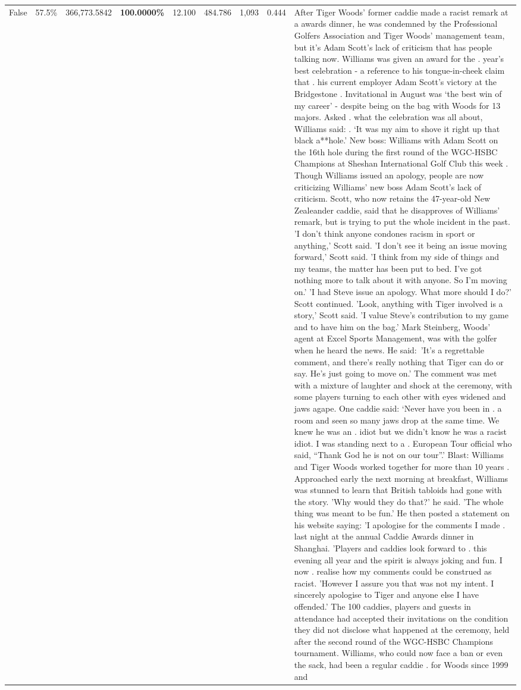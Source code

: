 \begin{table}[H]
\begin{tabular}{lllrlllll}
False & 57.5\% & 366,773.5842 & \bfseries \color{red} 100.0000\% & 12.100 & 484.786 & 1,093 & 0.444 & After Tiger Woods' former caddie made a racist remark at a awards dinner, he was condemned by the Professional Golfers Association and Tiger Woods' management team, but it's Adam Scott's lack of criticism that has people talking now. Williams was given an award for the . year’s best celebration - a reference to his tongue-in-cheek claim that . his current employer Adam Scott’s victory at the Bridgestone . Invitational in August was ‘the best win of my career’ - despite being on the bag with Woods for 13 majors. Asked . what the celebration was all about, Williams said: . ‘It was my aim to shove it right up that black a**hole.’ New boss: Williams with Adam Scott  on the 16th hole during the first round of the WGC-HSBC Champions at Sheshan International Golf Club this week . Though Williams issued an apology, people are now criticizing Williams' new boss Adam Scott's lack of criticism. Scott, who now retains the 47-year-old New Zealeander caddie, said that he disapproves of Williams' remark, but is trying to put the whole incident in the past. 'I don't think anyone condones racism in sport or anything,' Scott said. 'I don't see it being an issue moving forward,' Scott said. 'I think from my side of things and my teams, the matter has been put to bed. I've got nothing more to talk about it with anyone. So I'm moving on.' 'I had Steve issue an apology. What more should I do?' Scott continued. 'Look, anything with Tiger involved is a story,' Scott said. 'I value Steve's contribution to my game and to have him on the bag.' Mark Steinberg, Woods' agent at Excel Sports Management, was with the golfer when he heard the news. He said: 'It's a regrettable comment, and there's really nothing that Tiger can do or say. He's just going to move on.' The comment was met with a mixture of laughter and shock at the ceremony, with some players turning to each other with eyes widened and jaws agape. One caddie said: ‘Never have you been in . a room and seen so many jaws drop at the same time. We knew he was an . idiot but we didn’t know he was a racist idiot. I was standing next to a . European Tour official who said, “Thank God he is not on our tour”.’ Blast: Williams and Tiger Woods worked together for more than 10 years . Approached early the next morning at breakfast, Williams was stunned to learn that British tabloids had gone with the story. 'Why would they do that?' he said. 'The whole thing was meant to be fun.' He then posted a statement on his website saying: 'I apologise for the comments I made . last night at the annual Caddie Awards dinner in Shanghai. 'Players and caddies look forward to . this evening all year and the spirit is always joking and fun. I now . realise how my comments could be construed as racist. 'However I assure you that was not my intent. I sincerely apologise to Tiger and anyone else I have offended.' The 100 caddies, players and guests in attendance had accepted their invitations on the condition they did not disclose what happened at the ceremony, held after the second round of the WGC-HSBC Champions tournament. Williams, who could now face a ban or even the sack, had been a regular caddie . for Woods since 1999 and 
\end{tabular}
\end{table}
